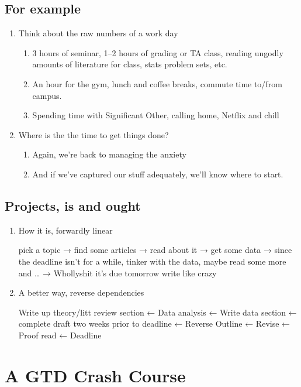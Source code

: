 \documentclass[11pt]{article}
\begin{document}
\subsection{For example}
\label{sec-4-2}
\begin{enumerate}
\item Think about the raw numbers of a work day
\begin{enumerate}
\item 3 hours of seminar, 1--2 hours of grading or TA class, reading
ungodly amounts of literature for class, stats problem sets, etc.
\item An hour for the gym, lunch and coffee breaks, commute time
to/from campus.
\item Spending time with Significant Other, calling home, Netflix and chill
\end{enumerate}
\item Where is the the time to get things done?
\begin{enumerate}
\item Again, we're back to managing the anxiety
\item And if we've captured our stuff adequately, we'll know where to
start.
\end{enumerate}
\end{enumerate}
\subsection{Projects, is and ought}
\label{sec-4-3}
\begin{enumerate}
\item How it is, forwardly linear
\label{sec-4-3-1}

pick a topic → find some articles → read about it → get some data →
since the deadline isn't for a while, tinker with the data, maybe read
some more and \ldots{} → Whollyshit it's due tomorrow write like crazy

\item A better way, reverse dependencies
\label{sec-4-3-2}

Write up theory/litt review section ← Data analysis ← Write data
section ← complete  draft two weeks prior to deadline ← Reverse Outline ← Revise ← Proof read ← Deadline
\end{enumerate}

\section{A GTD Crash Course}
\label{sec-5}
\end{document}
